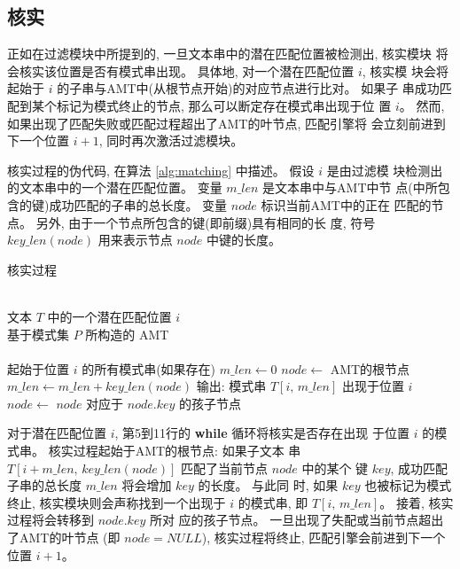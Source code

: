 \subsection{核实}
\label{subsec:matching}

正如在过滤模块中所提到的, 一旦文本串中的潜在匹配位置被检测出, 核实模块
将会核实该位置是否有模式串出现。 具体地, 对一个潜在匹配位置 $i$, 核实模
块会将起始于 $i$ 的子串与AMT中(从根节点开始)的对应节点进行比对。 如果子
串成功匹配到某个标记为模式终止的节点, 那么可以断定存在模式串出现于位
置 $i$。 然而, 如果出现了匹配失败或匹配过程超出了AMT的叶节点, 匹配引擎将
会立刻前进到下一个位置 $i+1$, 同时再次激活过滤模块。

核实过程的伪代码, 在算法 \ref{alg:matching} 中描述。 假设 $i$ 是由过滤模
块检测出的文本串中的一个潜在匹配位置。 变量 $m\_len$ 是文本串中与AMT中节
点(中所包含的键)成功匹配的子串的总长度。 变量 $node$ 标识当前AMT中的正在
匹配的节点。 另外, 由于一个节点所包含的键(即前缀)具有相同的长
度, 符号 $key\_len(node)$ 用来表示节点 $node$ 中键的长度。

\begin{algorithm}
  \caption{核实过程}\scriptsize
  \label{alg:matching}
  \begin{algorithmic}[1]
    \REQUIRE ~~\\
    文本 $T$ 中的一个潜在匹配位置 $i$ \\
    基于模式集 $P$ 所构造的 AMT\\
    \ENSURE ~~\\
    起始于位置 $i$ 的所有模式串(如果存在)
    \STATE
    \STATE $m\_len \leftarrow 0$
    \STATE $node \leftarrow $ AMT的根节点
    \STATE
    \STATE $m\_len \leftarrow m\_len + key\_len(node)$
    \STATE 输出: 模式串 $T[i,\,m\_len]$ 出现于位置 $i$
    \ENDIF
    \STATE $node \leftarrow$  $node$ 对应于 $node.key$ 的孩子节点
    \ENDWHILE
  \end{algorithmic}
\end{algorithm}

对于潜在匹配位置 $i$, 第5到11行的 \textbf{while} 循环将核实是否存在出现
于位置 $i$ 的模式串。 核实过程起始于AMT的根节点: 如果子文本
串 $T[i+m\_len, \, key\_len(node)]$ 匹配了当前节点 $node$ 中的某个
键 $key$, 成功匹配子串的总长度 $m\_len$ 将会增加 $key$ 的长度。 与此同
时, 如果 $key$ 也被标记为模式终止, 核实模块则会声称找到一个出现于 $i$
的模式串, 即 $T[i,\,m\_len]$。 接着, 核实过程将会转移到 $node.key$ 所对
应的孩子节点。 一旦出现了失配或当前节点超出了AMT的叶节点 (即 $node =
NULL$), 核实过程将终止, 匹配引擎会前进到下一个位置 $i+1$。

